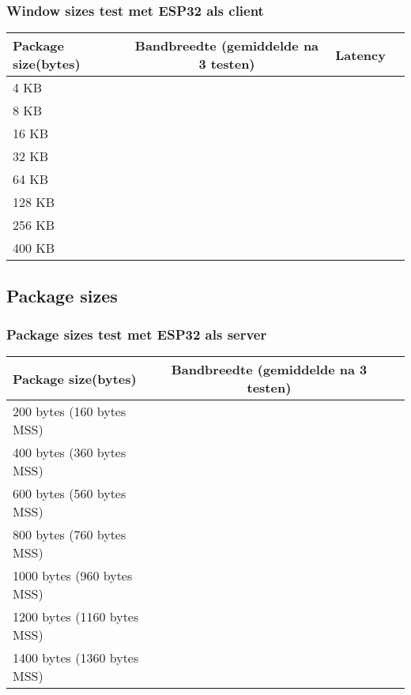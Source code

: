 \documentclass[../DCM2_Verslag.tex]{subfiles}
\begin{document}
\subsubsection{Window sizes test met ESP32 als client}
	\begin{tabular}{||l|c|r|p{6cm}||}
   	 Package size(bytes) & Bandbreedte (gemiddelde na 3 testen) & Latency\\
   	 \hline \hline    
   	 4 KB &  & \\
   	 8 KB &  & \\
   	 16 KB & & \\
   	 32 KB &  & \\
   	 64 KB & & \\
   	 128 KB & & \\
   	 256 KB & & \\
   	 400 KB & &\\
   	 \hline
	\end{tabular}
	

\subsection{Package sizes}


\subsubsection{Package sizes test met ESP32 als server}
	\begin{tabular}{||l|c|r|p{6cm}||}
   	 Package size(bytes) & Bandbreedte (gemiddelde na 3 testen)\\
   	 \hline \hline    
   	 200 bytes (160 bytes MSS) &  \\
   	 400 bytes (360 bytes MSS) &  \\
   	 600 bytes (560 bytes MSS) &  \\
   	 800 bytes (760 bytes MSS) &  \\
   	 1000 bytes (960 bytes MSS) & \\
   	 1200 bytes (1160 bytes MSS) &  \\
   	 1400 bytes (1360 bytes MSS) & \\
   	 \hline
	\end{tabular}
	
\end{document}
